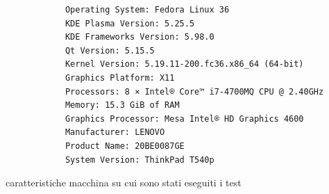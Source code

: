 \documentclass[compress]{beamer}
\begin{document}
    \begin{frame}[fragile]{\subsecname}
        \begin{verbatim}
            Operating System: Fedora Linux 36
            KDE Plasma Version: 5.25.5
            KDE Frameworks Version: 5.98.0
            Qt Version: 5.15.5
            Kernel Version: 5.19.11-200.fc36.x86_64 (64-bit)
            Graphics Platform: X11
            Processors: 8 × Intel® Core™ i7-4700MQ CPU @ 2.40GHz
            Memory: 15.3 GiB of RAM
            Graphics Processor: Mesa Intel® HD Graphics 4600
            Manufacturer: LENOVO
            Product Name: 20BE0087GE
            System Version: ThinkPad T540p
        \end{verbatim}
        \vfill
        caratteristiche macchina su cui sono stati eseguiti i test
    \end{frame}
\end{document}
